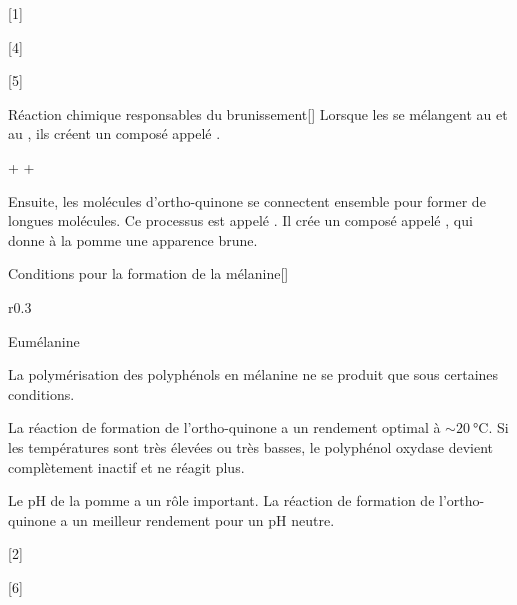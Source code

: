 [1]

[4]

[5]

\begin{doc}{Réaction chimique responsables du brunissement}[\label{doc:reaction_brunissement}]
  Lorsque les  se mélangent au  et au , ils créent un composé appelé .

  \begin{center}
     + \dioxygene + 
    \reaction
  \end{center}

  Ensuite, les molécules d'ortho-quinone se connectent ensemble pour former de longues molécules.
  Ce processus est appelé .
  Il crée un composé appelé , qui donne à la pomme une apparence brune.
\end{doc}

\begin{doc}{Conditions pour la formation de la mélanine}[\label{doc:formation_melanine}]
  \begin{wrapfigure}{r}{0.3\linewidth}
    \centering
    \vspace*{-38pt}

    Eumélanine
  \end{wrapfigure}
  La polymérisation des polyphénols en mélanine ne se produit que sous certaines conditions.
  \begin{listePoints}
    \item La réaction de formation de l'ortho-quinone a un rendement optimal à $\sim\qty{20}{\degreeCelsius}$.
    Si les températures sont très élevées ou très basses, le polyphénol oxydase devient complètement inactif et ne réagit plus.
    \item Le pH de la pomme a un rôle important. La réaction de formation de l'ortho-quinone a un meilleur rendement pour un pH neutre.
  \end{listePoints}
\end{doc}

[2]

[6]